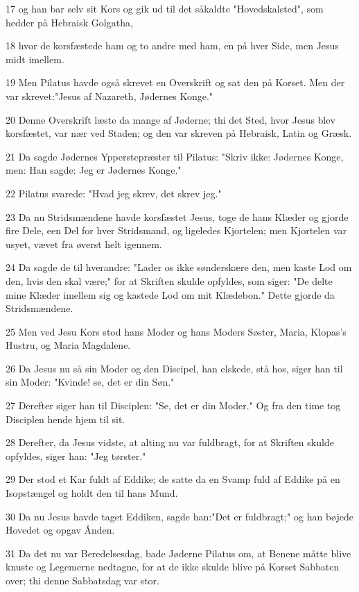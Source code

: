 \par 17 og han bar selv sit Kors og gik ud til det såkaldte "Hovedskalsted", som hedder på Hebraisk Golgatha,
\par 18 hvor de korsfæstede ham og to andre med ham, en på hver Side, men Jesus midt imellem.
\par 19 Men Pilatus havde også skrevet en Overskrift og sat den på Korset. Men der var skrevet:"Jesus af Nazareth, Jødernes Konge."
\par 20 Denne Overskrift læste da mange af Jøderne; thi det Sted, hvor Jesus blev korsfæstet, var nær ved Staden; og den var skreven på Hebraisk, Latin og Græsk.
\par 21 Da sagde Jødernes Ypperstepræster til Pilatus: "Skriv ikke: Jødernes Konge, men: Han sagde: Jeg er Jødernes Konge."
\par 22 Pilatus svarede: "Hvad jeg skrev, det skrev jeg."
\par 23 Da nu Stridsmændene havde korsfæstet Jesus, toge de hans Klæder og gjorde fire Dele, een Del for hver Stridsmand, og ligeledes Kjortelen; men Kjortelen var usyet, vævet fra øverst helt igennem.
\par 24 Da sagde de til hverandre: "Lader os ikke sønderskære den, men kaste Lod om den, hvis den skal være;" for at Skriften skulde opfyldes, som siger: "De delte mine Klæder imellem sig og kastede Lod om mit Klædebon." Dette gjorde da Stridsmændene.
\par 25 Men ved Jesu Kors stod hans Moder og hans Moders Søster, Maria, Klopas's Hustru, og Maria Magdalene.
\par 26 Da Jesus nu så sin Moder og den Discipel, han elskede, stå hos, siger han til sin Moder: "Kvinde! se, det er din Søn."
\par 27 Derefter siger han til Disciplen: "Se, det er din Moder." Og fra den time tog Disciplen hende hjem til sit.
\par 28 Derefter, da Jesus vidste, at alting nu var fuldbragt, for at Skriften skulde opfyldes, siger han: "Jeg tørster."
\par 29 Der stod et Kar fuldt af Eddike; de satte da en Svamp fuld af Eddike på en Isopstængel og holdt den til hans Mund.
\par 30 Da nu Jesus havde taget Eddiken, sagde han:"Det er fuldbragt;" og han bøjede Hovedet og opgav Ånden.
\par 31 Da det nu var Beredelsesdag, bade Jøderne Pilatus om, at Benene måtte blive knuste og Legemerne nedtagne, for at de ikke skulde blive på Korset Sabbaten over; thi denne Sabbatsdag var stor.
